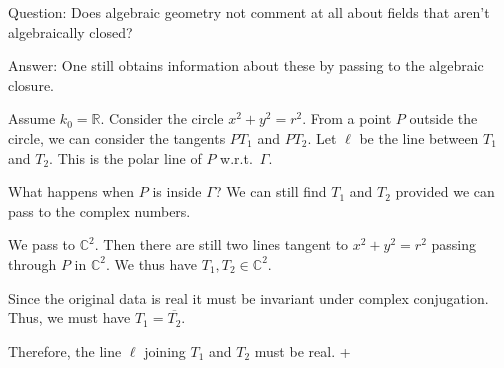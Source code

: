 \documentclass{article}
\theoremstyle{definition}
\begin{document}
    Question: Does algebraic geometry not comment at all about fields that aren't algebraically closed?

    Answer: One still obtains information about these by passing to the algebraic closure.

    Assume \(k_0 = \mathbb{R}\). Consider the circle \(x^2 + y^2 = r^2\). From a point \(P\) outside the circle, we can consider the tangents \(PT_1\) and \(PT_2\). Let \(\ell\) be the line between \(T_1\) and \(T_2\). This is the polar line of \(P\) w.r.t.\ \(\Gamma\).
    
    What happens when \(P\) is inside \(\Gamma\)? We can still find \(T_1\) and \(T_2\) provided we can pass to the complex numbers.

    We pass to \(\mathbb{C}^2\). Then there are still two lines tangent to \(x^2 + y^2 = r^2\) passing through \(P\) in \(\mathbb{C}^2\). We thus have \(T_1, T_2 \in \mathbb{C}^2\).

    Since the original data is real it must be invariant under complex conjugation. Thus, we must have \(T_1 = \overline{T_2}\).

    Therefore, the line \(\ell\) joining \(T_1\) and \(T_2\) must be real.
+
\end{document}

